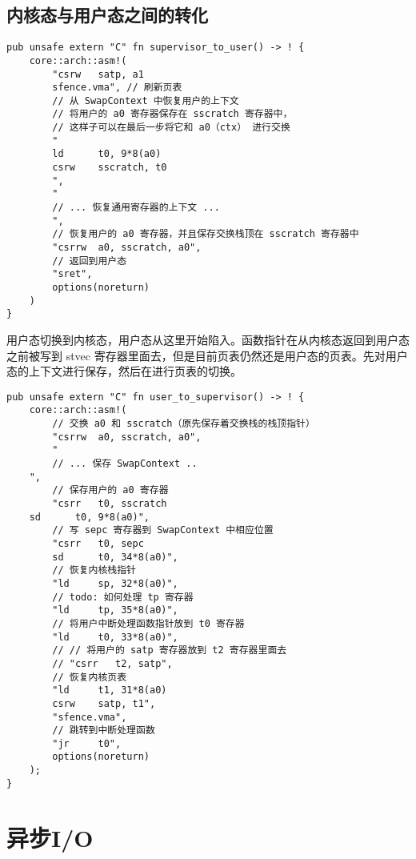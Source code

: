 \subsection{内核态与用户态之间的转化}

\begin{lstlisting}[caption=由内核态进入用户态]
pub unsafe extern "C" fn supervisor_to_user() -> ! {
    core::arch::asm!(
        "csrw   satp, a1
        sfence.vma", // 刷新页表
        // 从 SwapContext 中恢复用户的上下文
        // 将用户的 a0 寄存器保存在 sscratch 寄存器中，
        // 这样子可以在最后一步将它和 a0（ctx） 进行交换
        "
        ld      t0, 9*8(a0)
        csrw    sscratch, t0
        ",
        "
        // ... 恢复通用寄存器的上下文 ...
        ",
        // 恢复用户的 a0 寄存器，并且保存交换栈顶在 sscratch 寄存器中
        "csrrw  a0, sscratch, a0",
        // 返回到用户态
        "sret",
        options(noreturn)
    )
}

\end{lstlisting}


用户态切换到内核态，用户态从这里开始陷入。函数指针在从内核态返回到用户态之前被写到 stvec 寄存器里面去，但是目前页表仍然还是用户态的页表。先对用户态的上下文进行保存，然后在进行页表的切换。

\begin{lstlisting}[caption=由用户态进入内核态]
pub unsafe extern "C" fn user_to_supervisor() -> ! {
    core::arch::asm!(
        // 交换 a0 和 sscratch（原先保存着交换栈的栈顶指针）
        "csrrw  a0, sscratch, a0",
        "
        // ... 保存 SwapContext ..
    ",
        // 保存用户的 a0 寄存器
        "csrr   t0, sscratch
    sd      t0, 9*8(a0)",
        // 写 sepc 寄存器到 SwapContext 中相应位置
        "csrr   t0, sepc
        sd      t0, 34*8(a0)",
        // 恢复内核栈指针
        "ld     sp, 32*8(a0)",
        // todo: 如何处理 tp 寄存器
        "ld     tp, 35*8(a0)",
        // 将用户中断处理函数指针放到 t0 寄存器
        "ld     t0, 33*8(a0)",
        // // 将用户的 satp 寄存器放到 t2 寄存器里面去
        // "csrr   t2, satp",
        // 恢复内核页表
        "ld     t1, 31*8(a0)
        csrw    satp, t1",
        "sfence.vma",
        // 跳转到中断处理函数
        "jr     t0",
        options(noreturn)
    );
}
\end{lstlisting}


\section{异步I/O}

